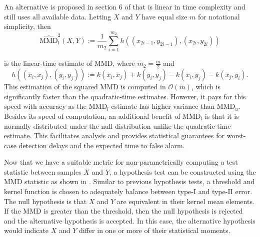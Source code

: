 An alternative is proposed in section 6 of \cite{gretton2012kernel} that is linear in time complexity and still uses all available data. Letting $X$ and $Y$ have equal size $m$ for notational simplicity, then
\begin{equation}
\label{mmd_linear}
\widehat{\text{MMD}}_{l}^{2}(X, Y) :=\frac{1}{m_{2}} \sum_{i=1}^{m_{2}} h\left(\left(x_{2 i-1}, y_{2 i-1}\right),\left(x_{2 i}, y_{2 i}\right)\right)
\end{equation}

is the linear-time estimate of MMD, where $m_2=\frac{m}{2}$ and
\begin{equation}
h\left((x_i, x_j), (y_i, y_j)\right):=k\left(x_{i}, x_{j}\right)+k\left(y_{i}, y_{j}\right)-k\left(x_{i}, y_{j}\right)-k\left(x_{j}, y_{i}\right).
\end{equation}
This estimation of the squared MMD is computed in $\mathcal{O}(m)$, which is significantly faster than the quadratic-time estimates. However, it pays for this speed with accuracy as the MMD$_l$ estimate has higher variance than MMD$_u$. Besides its speed of computation, an additional benefit of MMD$_l$ is that it is normally distributed under the null distribution unlike the quadratic-time estimate. This facilitates analysis and provides statistical guarantees for worst-case detection delays and the expected time to false alarm. 

Now that we have a suitable metric for non-parametrically computing a test statistic between samples $X$ and $Y$, a hypothesis test can be constructed using the MMD statistic as shown in \cite{gretton2012kernel}. Similar to previous hypothesis tests, a threshold and kernel function is chosen to adequately balance between type-I and type-II error. The null hypothesis is that $X$ and $Y$ are equivalent in their kernel mean elements.  If the MMD is greater than the threshold, then the null hypothesis is rejected and the alternative hypothesis is accepted. In this case, the alternative hypothesis would indicate $X$ and $Y$ differ in one  or more of their statistical moments.

